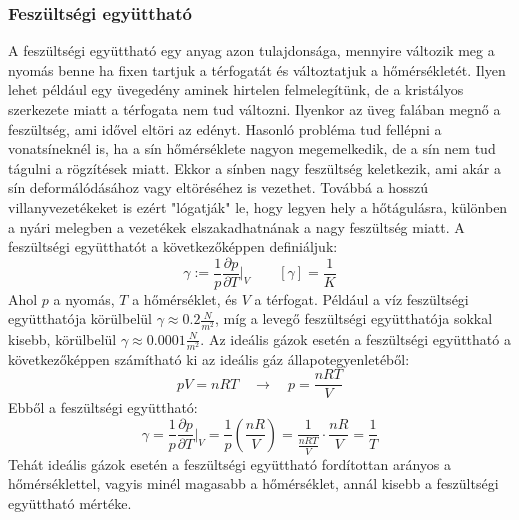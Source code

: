 \documentclass[a4paper,12pt]{article}
\begin{document}
\subsubsection*{Feszültségi együttható}
A feszültségi együttható egy anyag azon tulajdonsága, mennyire változik meg a nyomás benne ha fixen tartjuk a térfogatát és változtatjuk a hőmérsékletét.
Ilyen lehet például egy üvegedény aminek hirtelen felmelegítünk, de a kristályos szerkezete miatt a térfogata nem tud változni. Ilyenkor az üveg falában megnő a feszültség, ami idővel eltöri az edényt.
Hasonló probléma tud fellépni a vonatsíneknél is, ha a sín hőmérséklete nagyon megemelkedik, de a sín nem tud tágulni a rögzítések miatt. Ekkor a sínben nagy feszültség keletkezik, ami akár a sín deformálódásához vagy eltöréséhez is vezethet.
Továbbá a hosszú villanyvezetékeket is ezért "lógatják" le, hogy legyen hely a hőtágulásra, különben a nyári melegben a vezetékek elszakadhatnának a nagy feszültség miatt. 
A feszültségi együtthatót a következőképpen definiáljuk:
\begin{equation}
    \gamma := \frac{1}{p} \frac{\partial p}{\partial T}\bigg|_{V} \quad \quad \left[\gamma\right] = \frac{1}{K}
\end{equation}
Ahol $p$ a nyomás, $T$ a hőmérséklet, és $V$ a térfogat. Például a víz feszültségi együtthatója körülbelül $\gamma \approx 0.2 \frac{N}{m^2}$, míg a levegő feszültségi együtthatója sokkal kisebb, körülbelül $\gamma \approx 0.0001 \frac{N}{m^2}$.
Az ideális gázok esetén a feszültségi együttható a következőképpen számítható ki az ideális gáz állapotegyenletéből:
\begin{equation}
    pV = nRT \quad \rightarrow \quad p = \frac{nRT}{V}
\end{equation}
Ebből a feszültségi együttható:
\begin{equation}
    \gamma = \frac{1}{p} \frac{\partial p}{\partial T}\bigg|_{V} = \frac{1}{p} \left(\frac{nR}{V}\right) = \frac{1}{\frac{nRT}{V}} \cdot \frac{nR}{V} = \frac{1}{T}
\end{equation}
Tehát ideális gázok esetén a feszültségi együttható fordítottan arányos a hőmérséklettel, vagyis minél magasabb a hőmérséklet, annál kisebb a feszültségi együttható mértéke.
\end{document}
